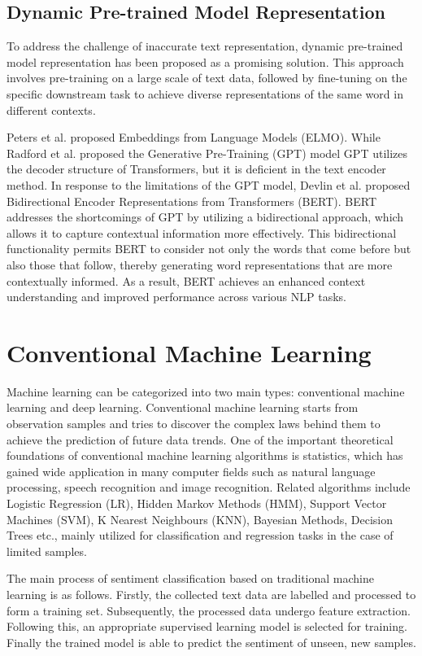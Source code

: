 \documentclass[ %
                    author={Louis Wang},
                supervisor={Dr. Qiang Liu},
                    degree={MSc},
                     title={Identification of Suicide Ideation in Texts},
                      type={},
                      year={2024}]{dissertation}
\begin{document}
\subsection{Dynamic Pre-trained Model Representation}
\noindent
To address the challenge of inaccurate text representation, dynamic pre-trained model representation has been proposed as a promising solution. This approach involves pre-training on a large scale of text data, followed by fine-tuning on the specific downstream task to achieve diverse representations of the same word in different contexts. 

Peters et al.\cite{peters2018deep} proposed Embeddings from Language Models (ELMO). While Radford et al.\cite{radford2018improving} proposed the Generative Pre-Training (GPT) model GPT utilizes the decoder structure of Transformers\cite{vaswani2017attention}, but it is deficient in the text encoder method. In response to the limitations of the GPT model, Devlin et al.\cite{devlin2018bert} proposed Bidirectional Encoder Representations from Transformers (BERT). BERT addresses the shortcomings of GPT by utilizing a bidirectional approach, which allows it to capture contextual information more effectively. This bidirectional functionality permits BERT to consider not only the words that come before but also those that follow, thereby generating word representations that are more contextually informed. As a result, BERT achieves an enhanced context understanding and improved performance across various NLP tasks.

\section{Conventional Machine Learning}
\noindent
Machine learning can be categorized into two main types: conventional machine learning and deep learning. Conventional machine learning starts from observation samples and tries to discover the complex laws behind them to achieve the prediction of future data trends. One of the important theoretical foundations of conventional machine learning algorithms is statistics, which has gained wide application in many computer fields such as natural language processing, speech recognition and image recognition. Related algorithms include Logistic Regression (LR), Hidden Markov Methods (HMM), Support Vector Machines (SVM), K Nearest Neighbours (KNN), Bayesian Methods, Decision Trees etc., mainly utilized for classification and regression tasks in the case of limited samples.

The main process of sentiment classification based on traditional machine learning is as follows. Firstly, the collected text data are labelled and processed to form a training set. Subsequently, the processed data undergo feature extraction. Following this, an appropriate supervised learning model is selected for training. Finally the trained model is able to predict the sentiment of unseen, new samples.
\end{document}
